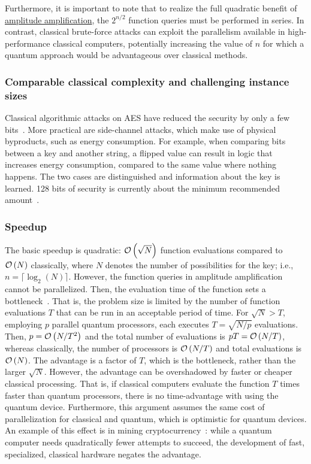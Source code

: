 \begin{refsection}
Furthermore, it is important to note that to realize the full quadratic benefit of \hyperref[prim:AmpAmp]{amplitude amplification}, the $2^{n/2}$ function queries must be performed in series. In contrast, classical brute-force attacks can exploit the parallelism available in high-performance classical computers, potentially increasing the value of $n$ for which a quantum approach would be advantageous over classical methods.

\subsubsection*{Comparable classical complexity and challenging instance sizes}
Classical algorithmic attacks on AES have reduced the security by only a few bits~\cite{bogdanov2011BicliqueAES}. More practical are side-channel attacks, which make use of physical byproducts, such as energy consumption. For example, when comparing bits between a key and another string, a flipped value can result in logic that increases energy consumption, compared to the same value where nothing happens. The two cases are distinguished and information about the key is learned. 128 bits of security is currently about the minimum recommended amount~\cite{barker2020KeyRecommendation}.

\subsubsection*{Speedup}
The basic speedup is quadratic: $\mathcal{O}\left( \sqrt{N} \right)$ function evaluations compared to $\mathcal{O}\left( N \right)$ classically, where $N$ denotes the number of possibilities for the key; i.e., $n=\lceil \log_2(N) \rceil$. However, the function queries in amplitude amplification cannot be parallelized. Then, the evaluation time of the function sets a bottleneck~\cite{bernstein2017PostQuantumCrypto}. That is, the problem size is limited by the number of function evaluations $T$ that can be run in an acceptable period of time. For $\sqrt{N}>T$, employing $p$ parallel quantum processors, each executes $T=\sqrt{N/p}$ evaluations. Then, $p=\mathcal{O}\left( N/T^2 \right)$ and the total number of evaluations is $pT=\mathcal{O}\left( N/T \right)$, whereas classically, the number of processors is $\mathcal{O}\left( N/T \right)$ and total evaluations is $\mathcal{O}\left( N \right)$. The advantage is a factor of $T$, which is the bottleneck, rather than the larger $\sqrt{N}$. However, the advantage can be overshadowed by faster or cheaper classical processing. That is, if classical computers evaluate the function $T$ times faster than quantum processors, there is no time-advantage with using the quantum device. Furthermore, this argument assumes the same cost of parallelization for classical and quantum, which is optimistic for quantum devices. An example of this effect is in mining cryptocurrency~\cite{aggarwal2018QuantumAttacksBitcoin}: while a quantum computer needs quadratically fewer attempts to succeed, the development of fast, specialized, classical hardware negates the advantage.


\end{refsection}
